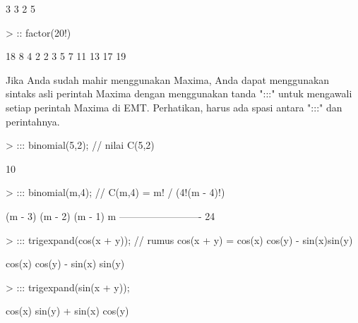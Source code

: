 \documentclass{report}
\begin{document}
\begin{eulernotebook}
\begin{eulercomment}
\begin{eulercomment}
\begin{euleroutput}
                                   3  3
                                  2  5
  
\end{euleroutput}
\begin{eulerprompt}
> :: factor(20!)
\end{eulerprompt}
\begin{euleroutput}
  
                          18  8  4  2
                         2   3  5  7  11 13 17 19
  
\end{euleroutput}
\begin{eulercomment}
Jika Anda sudah mahir menggunakan Maxima, Anda dapat menggunakan
sintaks asli perintah Maxima dengan menggunakan tanda ":::" untuk
mengawali setiap perintah Maxima di EMT. Perhatikan, harus ada spasi
antara ":::" dan perintahnya.
\end{eulercomment}
\begin{eulerprompt}
> ::: binomial(5,2); // nilai C(5,2)
\end{eulerprompt}
\begin{euleroutput}
  
                                    10
  
\end{euleroutput}
\begin{eulerprompt}
> ::: binomial(m,4); // C(m,4) = m! / (4!(m - 4)!)
\end{eulerprompt}
\begin{euleroutput}
  
                        (m - 3) (m - 2) (m - 1) m
                        -------------------------
                                   24
  
\end{euleroutput}
\begin{eulerprompt}
> ::: trigexpand(cos(x + y)); // rumus cos(x + y) = cos(x) cos(y) - sin(x)sin(y)
\end{eulerprompt}
\begin{euleroutput}
  
                      cos(x) cos(y) - sin(x) sin(y)
  
\end{euleroutput}
\begin{eulerprompt}
> ::: trigexpand(sin(x + y));
\end{eulerprompt}
\begin{euleroutput}
  
                      cos(x) sin(y) + sin(x) cos(y)
  

\end{euleroutput}
\end{eulercomment}
\end{eulercomment}
\end{eulernotebook}
\end{document}
